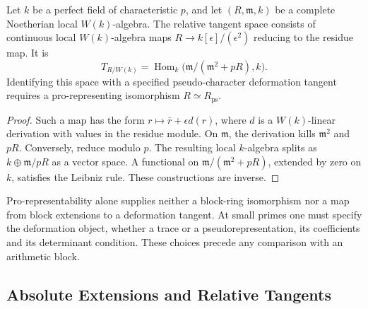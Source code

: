 \begin{lemma}
\label{v4-arith:w10-b:lem:ps-tangent}
Let \(k\) be a perfect field of characteristic \(p\), and let
\((R,\mathfrak m,k)\) be a complete Noetherian local \(W(k)\)-algebra.
The relative tangent space consists of continuous local
\(W(k)\)-algebra maps \(R\to k[\epsilon]/(\epsilon^2)\) reducing to
the residue map. It is
\begin{equation}
\label{v4-arith:w10-b:eq:ps-tangent}
 T_{R/W(k)}=\operatorname{Hom}_k
 \bigl(\mathfrak m/(\mathfrak m^2+pR),k\bigr).
\end{equation}
Identifying this space with a specified pseudo-character deformation
tangent requires a pro-representing isomorphism \(R\simeq R_{\mathrm{ps}}\).
\end{lemma}
\begin{proof}
Such a map has the form \(r\mapsto\bar r+\epsilon d(r)\), where
\(d\) is a \(W(k)\)-linear derivation with values in the residue module.
On \(\mathfrak m\), the derivation kills \(\mathfrak m^2\) and \(pR\).
Conversely, reduce modulo \(p\). The resulting local \(k\)-algebra
splits as \(k\oplus\mathfrak m/pR\) as a vector space. A functional
on \(\mathfrak m/(\mathfrak m^2+pR)\), extended by zero on \(k\),
satisfies the Leibniz rule. These constructions are inverse.
\end{proof}

\begin{remark}
\label{v4-arith:w10-b:rem:why-ps}
Pro-representability alone supplies neither a block-ring isomorphism
nor a map from block extensions to a deformation tangent.
At small primes one must specify the deformation object, whether a
trace or a pseudorepresentation, its coefficients and its determinant
condition. These choices precede any comparison with an arithmetic block.
\end{remark}

\subsection{Absolute Extensions and Relative Tangents}

